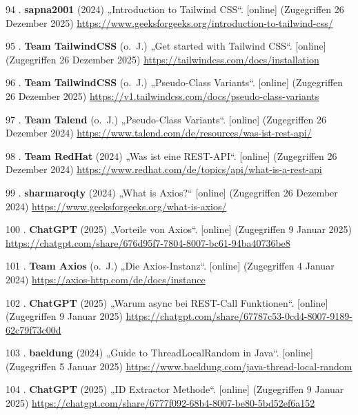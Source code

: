 \documentclass[
    headings=optiontotocandhead,%
    twoside,
    numbers=noenddot,%
    12pt, %
    titlepage, %
    parskip=full, %
    listof=leveldown, 
    numbers=noenddot, %
    a4paper,DIV=14,
    BCOR=15mm,
]{scrbook}
\newlength{\cslhangindent}
\newenvironment{cslreferences}%
  {\setlength{\parindent}{0pt}%
  \everypar{\setlength{\hangindent}{\cslhangindent}}\ignorespaces}%
  {\par}
\begin{document}
\begin{cslreferences}
\leavevmode\hypertarget{ref-GeeksForGeeks-TailwindCSS}{}%
94 . \textbf{sapna2001} (2024) „Introduction to Tailwind CSS``.
{[}online{]} (Zugegriffen 26 Dezember 2025)
\url{https://www.geeksforgeeks.org/introduction-to-tailwind-css/}

\leavevmode\hypertarget{ref-TailwindCSS-Docs-GettingStarted}{}%
95 . \textbf{Team TailwindCSS} (o.~J.) „Get started with Tailwind CSS``.
{[}online{]} (Zugegriffen 26 Dezember 2025)
\url{https://tailwindcss.com/docs/installation}

\leavevmode\hypertarget{ref-TailwindCSS-DocsV1}{}%
96 . \textbf{Team TailwindCSS} (o.~J.) „Pseudo-Class Variants``.
{[}online{]} (Zugegriffen 26 Dezember 2025)
\url{https://v1.tailwindcss.com/docs/pseudo-class-variants}

\leavevmode\hypertarget{ref-Talend-REST}{}%
97 . \textbf{Team Talend} (o.~J.) „Pseudo-Class Variants``. {[}online{]}
(Zugegriffen 26 Dezember 2024)
\url{https://www.talend.com/de/resources/was-ist-rest-api/}

\leavevmode\hypertarget{ref-RedHat-REST}{}%
98 . \textbf{Team RedHat} (2024) „Was ist eine REST-API``. {[}online{]}
(Zugegriffen 26 Dezember 2024)
\url{https://www.redhat.com/de/topics/api/what-is-a-rest-api}

\leavevmode\hypertarget{ref-GeeksForGeeks-Axios}{}%
99 . \textbf{sharmaroqty} (2024) „What is Axios?{}`` {[}online{]}
(Zugegriffen 26 Dezember 2024)
\url{https://www.geeksforgeeks.org/what-is-axios/}

\leavevmode\hypertarget{ref-gpt-AxiosVT}{}%
100 . \textbf{ChatGPT} (2025) „Vorteile von Axios``. {[}online{]}
(Zugegriffen 9 Januar 2025)
\url{https://chatgpt.com/share/676d95f7-7804-8007-bc61-94ba40736be8}

\leavevmode\hypertarget{ref-Axios-Docs-Instance}{}%
101 . \textbf{Team Axios} (o.~J.) „Die Axios-Instanz``. {[}online{]}
(Zugegriffen 4 Januar 2024)
\url{https://axios-http.com/de/docs/instance}

\leavevmode\hypertarget{ref-gpt-WarumAsync}{}%
102 . \textbf{ChatGPT} (2025) „Warum async bei REST-Call Funktionen``.
{[}online{]} (Zugegriffen 9 Januar 2025)
\url{https://chatgpt.com/share/67787c53-0cd4-8007-9189-62c79f73c00d}

\leavevmode\hypertarget{ref-Baeldung-JavaRandom}{}%
103 . \textbf{baeldung} (2024) „Guide to ThreadLocalRandom in Java``.
{[}online{]} (Zugegriffen 5 Januar 2025)
\url{https://www.baeldung.com/java-thread-local-random}

\leavevmode\hypertarget{ref-gpt-IdExtractor}{}%
104 . \textbf{ChatGPT} (2025) „ID Extractor Methode``. {[}online{]}
(Zugegriffen 9 Januar 2025)
\url{https://chatgpt.com/share/6777f092-68b4-8007-be80-5bd52ef6a152}


\end{cslreferences}
\end{document}
